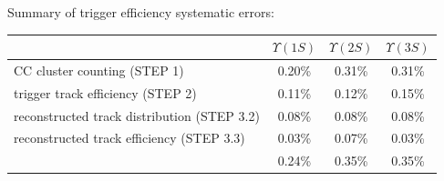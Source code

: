 \documentclass[landscape]{article}
\begin{document}
\vfill

\pagebreak

Summary of trigger efficiency systematic errors:

\begin{center}
  \renewcommand{\arraystretch}{1.25}
  \begin{tabular}{p{13 cm} c c c}
    & \mbox{\hspace{0.5 cm}} $\Upsilon(1S)$ \mbox{\hspace{0.5 cm}} & \mbox{\hspace{0.5 cm}} $\Upsilon(2S)$ \mbox{\hspace{0.5 cm}} & \mbox{\hspace{0.5 cm}} $\Upsilon(3S)$ \mbox{\hspace{0.5 cm}} \\\hline
    CC cluster counting (STEP 1) & 0.20\% & 0.31\% & 0.31\% \\
    trigger track efficiency (STEP 2) & 0.11\% & 0.12\% & 0.15\% \\
    reconstructed track distribution (STEP 3.2) & 0.08\% & 0.08\% & 0.08\% \\
    reconstructed track efficiency (STEP 3.3) & 0.03\% & 0.07\% & 0.03\% \\\hline\hline
    & 0.24\% & 0.35\% & 0.35\% \\
  \end{tabular}
\end{center}

\vfill
\end{document}
